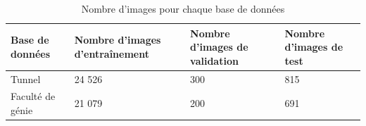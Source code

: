     \begin{table}[H]
        \centering
        \caption{Nombre d'images pour chaque base de données}
        \label{tab:nb_image_bd}
        \begin{tabular}{p{4cm}p{3cm}p{2.25cm}p{2.25cm}}
            \midrule
            Base de données &  Nombre d'images d'entraînement & Nombre d'images de validation & Nombre d'images de test\\
            \midrule\midrule
            Tunnel & 24 526 & 300 & 815\\
            Faculté de génie & 21 079 & 200 & 691\\
            \midrule
        \end{tabular}
    \end{table}

